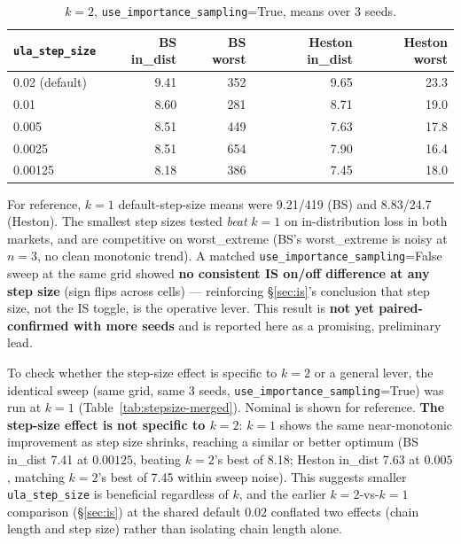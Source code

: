 \documentclass[11pt]{article}
\begin{document}
\begin{table}[h]
  \centering
  \caption{$k=2$, \texttt{use\_importance\_sampling}=True, means over 3 seeds.}
  \label{tab:stepsize}
  \begin{tabular}{lrrrr}
    \toprule
    \texttt{ula\_step\_size} & BS in\_dist & BS worst & Heston in\_dist & Heston worst \\
    \midrule
    0.02 (default) & 9.41 & 352 & 9.65 & 23.3 \\
    0.01 & 8.60 & 281 & 8.71 & 19.0 \\
    0.005 & 8.51 & 449 & 7.63 & 17.8 \\
    0.0025 & 8.51 & 654 & 7.90 & 16.4 \\
    0.00125 & 8.18 & 386 & 7.45 & 18.0 \\
    \bottomrule
  \end{tabular}
\end{table}

For reference, $k=1$ default-step-size means were 9.21/419 (BS) and 8.83/24.7 (Heston). The
smallest step sizes tested \emph{beat} $k=1$ on in-distribution loss in both markets, and are
competitive on worst\_extreme (BS's worst\_extreme is noisy at $n=3$, no clean monotonic trend).
A matched \texttt{use\_importance\_sampling}=False sweep at the same grid showed \textbf{no
consistent IS on/off difference at any step size} (sign flips across cells) --- reinforcing
\S\ref{sec:is}'s conclusion that step size, not the IS toggle, is the operative lever. This result
is \textbf{not yet paired-confirmed with more seeds} and is reported here as a promising,
preliminary lead.

To check whether the step-size effect is specific to $k=2$ or a general lever, the identical
sweep (same grid, same 3 seeds, \texttt{use\_importance\_sampling}=True) was run at $k=1$
(Table~\ref{tab:stepsize-merged}). Nominal is shown for reference. \textbf{The step-size effect
is not specific to $k=2$}: $k=1$ shows the same near-monotonic improvement as step size shrinks,
reaching a similar or better optimum (BS in\_dist 7.41 at $0.00125$, beating $k=2$'s best of
8.18; Heston in\_dist 7.63 at $0.005$, matching $k=2$'s best of 7.45 within sweep noise). This
suggests smaller \texttt{ula\_step\_size} is beneficial regardless of $k$, and the earlier
$k=2$-vs-$k=1$ comparison (\S\ref{sec:is}) at the shared default $0.02$ conflated two effects
(chain length and step size) rather than isolating chain length alone.
\end{document}
